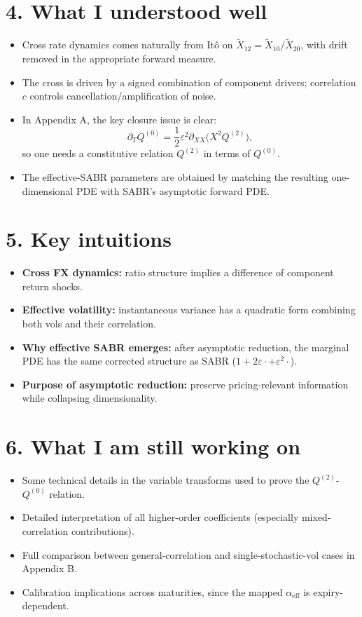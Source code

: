 \documentclass[11pt,a4paper]{article}
\begin{document}
\section*{4. What I understood well}
\begin{itemize}
    \item Cross rate dynamics comes naturally from It\^o on \(\widetilde X_{12}=\widetilde X_{10}/\widetilde X_{20}\), with drift removed in the appropriate forward measure.
    \item The cross is driven by a signed combination of component drivers; correlation \(c\) controls cancellation/amplification of noise.
    \item In Appendix A, the key closure issue is clear:
    \[
    \partial_T Q^{(0)}=\frac12\varepsilon^2\partial_{XX}\!\bigl(X^2Q^{(2)}\bigr),
    \]
    so one needs a constitutive relation \(Q^{(2)}\) in terms of \(Q^{(0)}\).
    \item The effective-SABR parameters are obtained by matching the resulting one-dimensional PDE with SABR's asymptotic forward PDE.
\end{itemize}

\section*{5. Key intuitions}
\begin{itemize}
    \item \textbf{Cross FX dynamics:} ratio structure implies a difference of component return shocks.
    \item \textbf{Effective volatility:} instantaneous variance has a quadratic form combining both vols and their correlation.
    \item \textbf{Why effective SABR emerges:} after asymptotic reduction, the marginal PDE has the same corrected structure as SABR (\(1+2\varepsilon \cdot +\varepsilon^2\cdot\)).
    \item \textbf{Purpose of asymptotic reduction:} preserve pricing-relevant information while collapsing dimensionality.
\end{itemize}

\section*{6. What I am still working on}
\begin{itemize}
    \item Some technical details in the variable transforms used to prove the \(Q^{(2)}\)-\(Q^{(0)}\) relation.
    \item Detailed interpretation of all higher-order coefficients (especially mixed-correlation contributions).
    \item Full comparison between general-correlation and single-stochastic-vol cases in Appendix B.
    \item Calibration implications across maturities, since the mapped \(\alpha_{\mathrm{eff}}\) is expiry-dependent.
\end{itemize}
\end{document}
